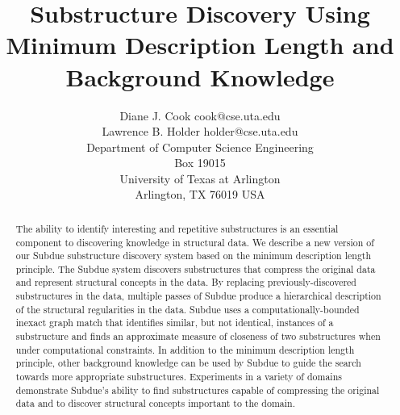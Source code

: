 


\newcommand{\fig}[2]{
\begin{figure}
\bigskip
\centerline{\psfig{figure=figures/#1.ps}}
\caption{#2}
\label{fig:#1}
\bigskip
\end{figure}
}

\newcommand{\xyfig}[4]{
\begin{figure}
\bigskip
\centerline{\psfig{figure=figures/#1.ps,width=#3in,height=#4in}}
\caption{#2}
\label{fig:#1}
\bigskip
\end{figure}
}

\newcommand{\comb}[2]{
\left( \!\! \begin{array}{c} #1 \\[-2ex] #2 \end{array} \!\! \right)
}




\title{Substructure Discovery Using Minimum Description Length and
Background Knowledge}

\author{\name Diane J. Cook \email cook@cse.uta.edu \\
\name Lawrence B. Holder \email holder@cse.uta.edu \\
\addr Department of Computer Science Engineering \\
Box 19015 \\
University of Texas at Arlington \\
Arlington, TX 76019 USA}

\maketitle

\begin{abstract}
The ability to identify interesting and repetitive substructures is an
essential component to discovering knowledge in structural data.  We
describe a new version of our {\sc Subdue} substructure discovery system
based on the minimum description length principle.  The {\sc Subdue} system
discovers substructures that compress the original data and represent
structural concepts in the data.  By replacing previously-discovered
substructures in the data, multiple passes of {\sc Subdue} produce a
hierarchical description of the structural regularities in the data.  {\sc
Subdue} uses a computationally-bounded inexact graph match that identifies
similar, but not identical, instances of a substructure and finds an
approximate measure of closeness of two substructures when under
computational constraints.  In addition to the minimum description length
principle, other background knowledge can be used by {\sc Subdue} to guide
the search towards more appropriate substructures.  Experiments in a
variety of domains demonstrate {\sc Subdue}'s ability to find substructures
capable of compressing the original data and to discover structural
concepts important to the domain.
\end{abstract}

